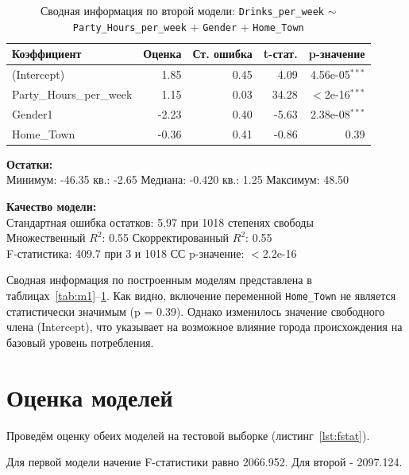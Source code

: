 \begin{table}[h]
	\centering
	\caption{Сводная информация по второй модели: \texttt{Drinks\_per\_week} $\sim$ \texttt{Party\_Hours\_per\_week} + \texttt{Gender} + \texttt{Home\_Town}}
	\begin{tabular}{lrrrr}
		\hline
		\textbf{Коэффициент} & \textbf{Оценка} & \textbf{Ст. ошибка} & \textbf{t-стат.} & \textbf{p-значение} \\
		\hline
		(Intercept)             & 1.85  & 0.45 & 4.09  & 4.56e-05$^{***}$ \\
		Party\_Hours\_per\_week & 1.15  & 0.03 & 34.28 & $<$2e-16$^{***}$ \\
		Gender1                 & -2.23 & 0.40 & -5.63 & 2.38e-08$^{***}$ \\
		Home\_Town              & -0.36 & 0.41 & -0.86 & 0.39 \\
		\hline
	\end{tabular}
	\vspace{0.5em}
	
	\textbf{Остатки:} \\
	Минимум: -46.35  кв.: -2.65 \quad Медиана: -0.420  кв.: 1.25 \quad Максимум: 48.50
	
	\vspace{0.5em}
	\textbf{Качество модели:} \\
	Стандартная ошибка остатков: 5.97 при 1018 степенях свободы \\
	Множественный $R^2$: 0.55 \quad Скорректированный $R^2$: 0.55 \\
	F-статистика: 409.7 при 3 и 1018 СС \quad p-значение: $<$2.2e-16
	\label{tab:m2}
\end{table}

Сводная информация по построенным моделям представлена в таблицах~\ref{tab:m1}--\ref{tab:m2}. Как видно, включение переменной \texttt{Home\_Town} не является статистически значимым (p = 0.39). Однако изменилось значение свободного члена (Intercept), что указывает на возможное влияние города происхождения на базовый уровень потребления.

\section{Оценка моделей}

Проведём оценку обеих моделей на тестовой выборке (листинг~\ref{lst:fstat}).


Для первой модели начение F-статистики \cite{wapnick2009} равно 2066.952. Для второй - 2097.124.

